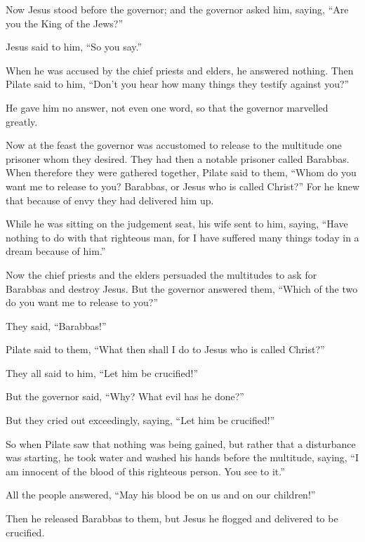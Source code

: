  Now Jesus stood before the governor; and the governor
asked him, saying, ``Are you the King of the Jews?''

Jesus said to him, ``So you say.''

 When he was accused by the chief priests and elders, he
answered nothing.  Then Pilate said to him, ``Don't you
hear how many things they testify against you?''

 He gave him no answer, not even one word, so that the
governor marvelled greatly.

 Now at the feast the governor was accustomed to release to
the multitude one prisoner whom they desired.  They had
then a notable prisoner called Barabbas.  When therefore
they were gathered together, Pilate said to them, ``Whom do you want me
to release to you? Barabbas, or Jesus who is called Christ?''
 For he knew that because of envy they had delivered him
up.

 While he was sitting on the judgement seat, his wife sent
to him, saying, ``Have nothing to do with that righteous man, for I have
suffered many things today in a dream because of him.''

 Now the chief priests and the elders persuaded the
multitudes to ask for Barabbas and destroy Jesus.  But the
governor answered them, ``Which of the two do you want me to release to
you?''

They said, ``Barabbas!''

 Pilate said to them, ``What then shall I do to Jesus who
is called Christ?''

They all said to him, ``Let him be crucified!''

 But the governor said, ``Why? What evil has he done?''

But they cried out exceedingly, saying, ``Let him be crucified!''

 So when Pilate saw that nothing was being gained, but
rather that a disturbance was starting, he took water and washed his
hands before the multitude, saying, ``I am innocent of the blood of this
righteous person. You see to it.''

 All the people answered, ``May his blood be on us and on
our children!''

 Then he released Barabbas to them, but Jesus he flogged
and delivered to be crucified.

